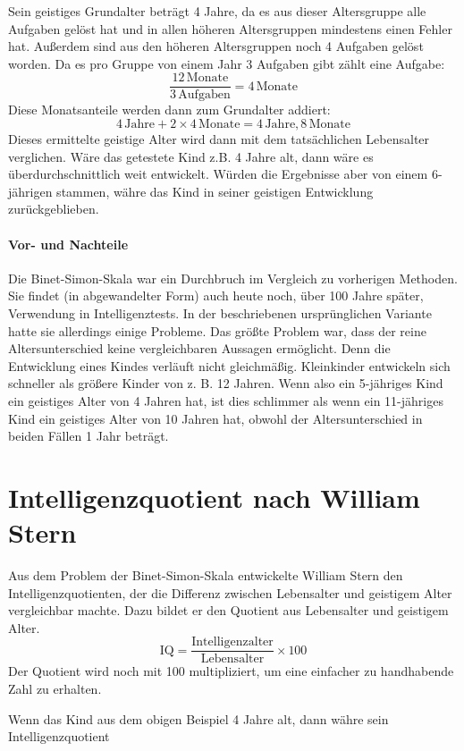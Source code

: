 Sein geistiges Grundalter beträgt 4 Jahre, da es aus dieser Altersgruppe alle Aufgaben gelöst hat und in allen höheren Altersgruppen mindestens einen Fehler hat. Außerdem sind aus den höheren Altersgruppen noch 4 Aufgaben gelöst worden. Da es pro Gruppe von einem Jahr 3 Aufgaben gibt zählt eine Aufgabe:
$$ \frac{12\,\mathrm{Monate}}{3\,\mathrm{Aufgaben}} = 4\,\mathrm{Monate} $$
Diese Monatsanteile werden dann zum Grundalter addiert:
$$ 4\,\mathrm{Jahre} + 2 \times 4\,\mathrm{Monate} = 4\,\mathrm{Jahre}, 8\,\mathrm{Monate} $$
Dieses ermittelte geistige Alter wird dann mit dem tatsächlichen Lebensalter verglichen.
Wäre das getestete Kind z.B. 4 Jahre alt, dann wäre es überdurchschnittlich weit entwickelt. Würden die Ergebnisse aber
von einem 6-jährigen stammen, währe das Kind in seiner geistigen Entwicklung zurückgeblieben.

\paragraph{Vor- und Nachteile}
Die Binet-Simon-Skala war ein Durchbruch im Vergleich zu vorherigen Methoden. Sie findet (in abgewandelter Form) auch heute noch, über 100 Jahre später, Verwendung in Intelligenztests. In der beschriebenen ursprünglichen Variante hatte sie allerdings einige Probleme. Das größte Problem war, dass der reine Altersunterschied keine vergleichbaren Aussagen ermöglicht. Denn die Entwicklung eines Kindes verläuft nicht gleichmäßig. Kleinkinder entwickeln sich schneller als größere Kinder von z. B. 12 Jahren. Wenn also ein 5-jähriges Kind ein geistiges Alter von 4 Jahren hat, ist dies schlimmer als wenn ein 11-jähriges Kind ein geistiges Alter von 10 Jahren hat, obwohl der Altersunterschied in beiden Fällen 1 Jahr beträgt.

\section{Intelligenzquotient nach William Stern}
Aus dem Problem der Binet-Simon-Skala entwickelte William Stern den Intelligenzquotienten, der die Differenz zwischen Lebensalter und geistigem Alter vergleichbar machte. Dazu bildet er den Quotient aus Lebensalter und geistigem Alter.
$$ \mathrm{IQ} = \frac{\mathrm{Intelligenzalter}}{\mathrm{Lebensalter}} \times 100 $$
Der Quotient wird noch mit 100 multipliziert, um eine einfacher zu handhabende Zahl zu erhalten.

Wenn das Kind aus dem obigen Beispiel 4 Jahre alt, dann währe sein Intelligenzquotient

